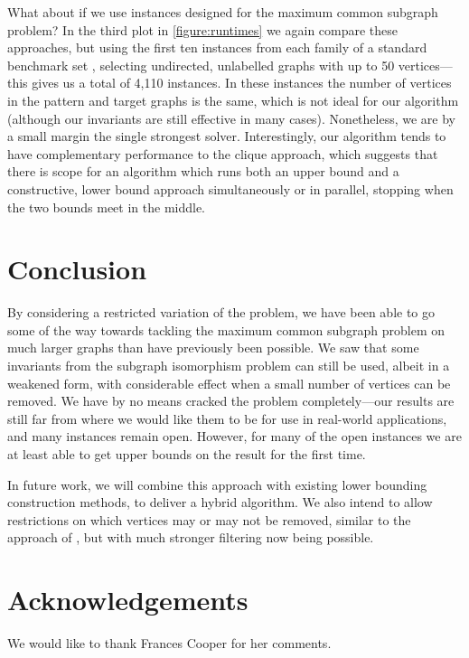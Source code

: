 \documentclass[letterpaper]{article}
\newcommand{\citet}[1]{\citeauthor{#1} \shortcite{#1}}
\newcommand{\citep}[1]{\cite{#1}}
\theoremstyle{definition}
\begin{document}
What about if we use instances designed for the maximum common subgraph problem? In the third plot
in \cref{figure:runtimes} we again compare these approaches, but using the first ten instances from
each family of a standard benchmark set
\citep{DBLP:journals/prl/SantoFSV03,DBLP:journals/jgaa/ConteFV07}, selecting undirected, unlabelled
graphs with up to 50 vertices---this gives us a total of 4,110 instances. In these instances the
number of vertices in the pattern and target graphs is the same, which is not ideal for our
algorithm (although our invariants are still effective in many cases). Nonetheless, we are by a
small margin the single strongest solver. Interestingly, our algorithm tends to have complementary
performance to the clique approach, which suggests that there is scope for an algorithm which runs
both an upper bound and a constructive, lower bound approach simultaneously or in parallel, stopping
when the two bounds meet in the middle.

\section{Conclusion}

By considering a restricted variation of the problem, we have been able to go some of the way
towards tackling the maximum common subgraph problem on much larger graphs than have previously been
possible. We saw that some invariants from the subgraph isomorphism problem can still be used,
albeit in a weakened form, with considerable effect when a small number of vertices can be removed.
We have by no means cracked the problem completely---our results are still far from where we
would like them to be for use in real-world applications, and many instances remain open. However,
for many of the open instances we are at least able to get upper bounds on the result for the
first time.

In future work, we will combine this approach with existing lower bounding construction methods, to
deliver a hybrid algorithm. We also intend to allow restrictions on which vertices may or may not be
removed, similar to the approach of \citet{DBLP:conf/cp/ZampelliDD05}, but with much stronger
filtering now being possible.

\section*{Acknowledgements}

We would like to thank Frances Cooper for her comments.




\end{document}

